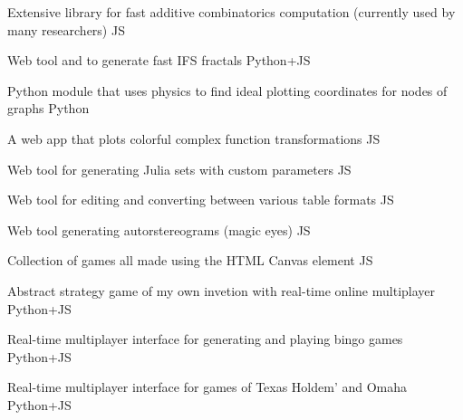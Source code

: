 

\begin{cvprojects}
  
  \cvproject
  {}
  {Extensive library for fast additive combinatorics computation (currently used by many researchers)}
  {JS}

  \cvproject
  {}
  {Web tool and  to generate fast IFS fractals}
  {Python+JS}


  \cvproject
  {}
  {Python module that uses physics to find ideal plotting coordinates for nodes of graphs}
  {Python}


  \cvproject
  {}
  {A web app that plots colorful complex function transformations}
  {JS}


  \cvproject
  {}
  {Web tool for generating Julia sets with custom parameters}
  {JS}


  
  \cvproject
  {}
  {Web tool for editing and converting between various table formats}
  {JS}

  \cvproject
  {}
  {Web tool generating autorstereograms (magic eyes)}
  {JS}

  \cvproject
  {}
  {Collection of games all made using the HTML Canvas element}
  {JS}


  \cvproject
  {}
  {Abstract strategy game of my own invetion with real-time online multiplayer}
  {Python+JS}

  \cvproject
  {}
  {Real-time multiplayer interface for generating and playing bingo games}
  {Python+JS}

  \cvproject
  {}
  {Real-time multiplayer interface for games of Texas Holdem' and Omaha}
  {Python+JS}



\end{cvprojects}